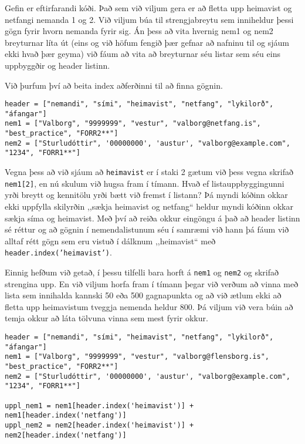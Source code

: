 \begin{exercise}\label{lst3}
Gefin er eftirfarandi kóði.
Það sem við viljum gera er að fletta upp heimavist og netfangi nemanda 1 og 2.
Við viljum búa til strengjabreytu sem inniheldur þessi gögn fyrir hvorn nemanda fyrir sig.
Án þess að vita hvernig nem1 og nem2 breyturnar líta út (eins og við höfum fengið þær gefnar að nafninu til og sjáum ekki hvað þær geyma) við fáum að vita að breyturnar séu listar sem séu eins uppbyggðir og header listinn.

Við þurfum því að beita index aðferðinni til að finna gögnin.
\begin{lstlisting}
header = ["nemandi", "sími", "heimavist", "netfang", "lykilorð", "áfangar"]
nem1 = ["Valborg", "9999999", "vestur", "valborg@netfang.is", "best_practice", "FORR2**"]
nem2 = ["Sturludóttir", '00000000', 'austur', "valborg@example.com", "1234", "FORR1**"]\end{lstlisting}

\end{exercise}
\begin{Answer}[ref={lst3}]
	Vegna þess að við sjáum að \texttt{heimavist} er í staki 2 gætum við þess vegna skrifað \texttt{nem1[2]}, en nú skulum við hugsa fram í tímann.
	Hvað ef listauppbyggingunni yrði breytt og kennitölu yrði bætt við fremst í listann?
	Þá myndi kóðinn okkar ekki uppfylla skilyrðin ,,sækja heimavist og netfang“ heldur myndi kóðinn okkar sækja síma og heimavist.
	Með því að reiða okkur eingöngu á það að header listinn sé réttur og að gögnin í nemendalistunum séu í samræmi við hann þá fáum við alltaf rétt gögn sem eru vistuð í dálknum ,,heimavist“ með \texttt{header.index('heimavist')}.


	Einnig hefðum við getað, í þessu tilfelli bara horft á \texttt{nem1} og \texttt{nem2} og skrifað strengina upp.
	En við viljum horfa fram í tímann þegar við verðum að vinna með lista sem innihalda kannski 50 eða 500 gagnapunkta og að við ætlum ekki að fletta upp heimavistum tveggja nemenda heldur 800.
	Þá viljum við vera búin að temja okkur að láta tölvuna vinna sem mest fyrir okkur. 
\begin{lstlisting}
header = ["nemandi", "sími", "heimavist", "netfang", "lykilorð", "áfangar"]
nem1 = ["Valborg", "9999999", "vestur", "valborg@flensborg.is", "best_practice", "FORR2**"]
nem2 = ["Sturludóttir", '00000000', 'austur', "valborg@example.com", "1234", "FORR1**"]

uppl_nem1 = nem1[header.index('heimavist')] + nem1[header.index('netfang')]
uppl_nem2 = nem2[header.index('heimavist')] + nem2[header.index('netfang')]\end{lstlisting}
\end{Answer}

